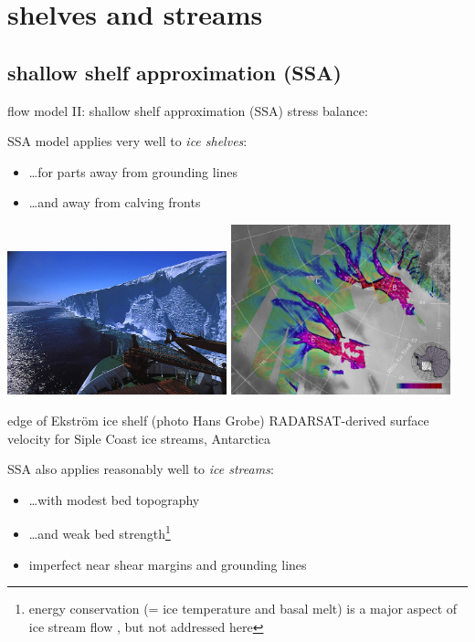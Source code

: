 \documentclass[titlepage,letterpaper,final,12pt]{scrartcl}
\newcommand{\alert}[1]{\emph{#1}}
\begin{document}
\section{shelves and streams}


\subsection{shallow shelf approximation (SSA)}

flow model II: shallow shelf approximation (SSA) stress balance:
  
SSA model applies very well to \alert{ice shelves}:
\begin{itemize}
\item \dots for parts away from grounding lines
\item \dots and away from calving fronts
\end{itemize}

\begin{center}
\includegraphics[width=2.5in]{ice_shelf_edge_hg}
\quad
\includegraphics[width=2.5in]{siple}

edge of Ekstr\"om ice shelf (photo Hans Grobe) \qquad RADARSAT-derived surface velocity for Siple Coast ice streams, Antarctica
\end{center}

SSA also applies reasonably well to \alert{ice streams}:
\begin{itemize}
\item \dots with modest bed topography
\item \dots and weak bed strength\footnote{energy conservation (= ice temperature and basal melt) is a major aspect of ice stream flow \cite{Raymondenergy}, but not addressed here}
\item imperfect near shear margins and grounding lines
\end{itemize}
\end{document}
